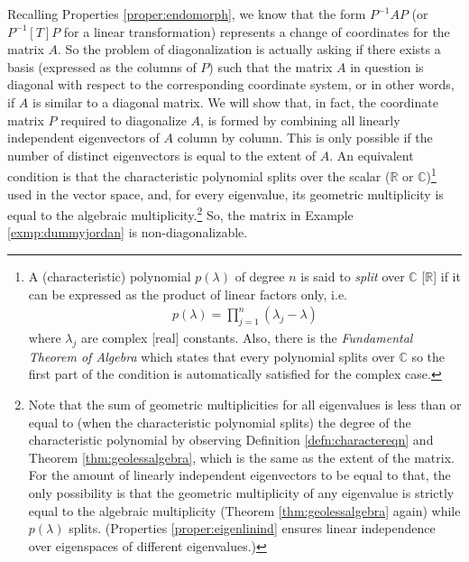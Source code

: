 Recalling Properties \ref{proper:endomorph}, we know that the form $P^{-1}AP$ (or $P^{-1}[T]P$ for a linear transformation) represents a change of coordinates for the matrix $A$. So the problem of diagonalization is actually asking if there exists a basis (expressed as the columns of $P$) such that the matrix $A$ in question is diagonal with respect to the corresponding coordinate system, or in other words, if $A$ is similar to a diagonal matrix. We will show that, in fact, the coordinate matrix $P$ required to diagonalize $A$, is formed by combining all linearly independent eigenvectors of $A$ column by column. This is only possible if the number of distinct eigenvectors is equal to the extent of $A$. An equivalent condition is that the characteristic polynomial splits over the scalar ($\mathbb{R}$ or $\mathbb{C}$)\footnote{\label{foot:split} A (characteristic) polynomial $p(\lambda)$ of degree $n$ is said to \textit{split} over $\mathbb{C}$ [$\mathbb{R}$] if it can be expressed as the product of linear factors only, i.e.\
\begin{align*}
p(\lambda) = \prod_{j=1}^n (\lambda_j - \lambda)    
\end{align*}
where $\lambda_j$ are complex [real] constants. Also, there is the \textit{Fundamental Theorem of Algebra} which states that every polynomial splits over $\mathbb{C}$ so the first part of the condition is automatically satisfied for the complex case.} used in the vector space, and, for every eigenvalue, its geometric multiplicity is equal to the algebraic multiplicity.\footnote{\label{foot:algequalgeo}Note that the sum of geometric multiplicities for all eigenvalues is less than or equal to (when the characteristic polynomial splits) the degree of the characteristic polynomial by observing Definition \ref{defn:charactereqn} and Theorem \ref{thm:geolessalgebra}, which is the same as the extent of the matrix. For the amount of linearly independent eigenvectors to be equal to that, the only possibility is that the geometric multiplicity of any eigenvalue is strictly equal to the algebraic multiplicity (Theorem \ref{thm:geolessalgebra} again) while $p(\lambda)$ splits. (Properties \ref{proper:eigenlinind} ensures linear independence over eigenspaces of different eigenvalues.)} So, the matrix in Example \ref{exmp:dummyjordan} is non-diagonalizable. 
